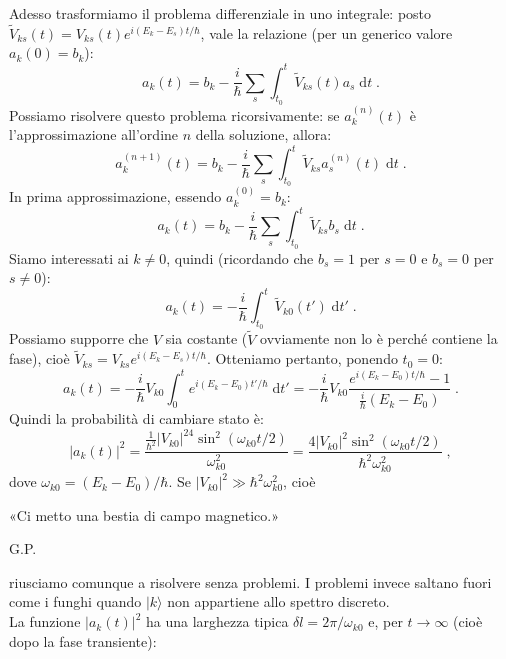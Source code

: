 \documentclass[10pt,a4paper]{report}
\theoremstyle{definition}
\numberwithin{equation}{section}
\newcommand{\diff}[1][]{\mathrm{d}#1}
\newcommand{\ket}{\rangle}
\begin{document}
Adesso trasformiamo il problema differenziale in uno integrale: posto $\tilde{V}_{ks}(t)=V_{ks}(t)e^{i(E_k-E_s)t/\hbar}$, vale la relazione (per un generico valore $a_k(0)=b_k$):
\begin{equation}
a_k(t)=b_k-\frac{i}{\hbar}\sum_s\int_{t_0}^t\tilde{V}_{ks}(t)a_s\;\diff{t}\;.
\end{equation}
Possiamo risolvere questo problema ricorsivamente: se $a_k^{(n)}(t)$ è l'approssimazione all'ordine $n$ della soluzione, allora:
\begin{equation}
a_k^{(n+1)}(t)=b_k-\frac{i}{\hbar}\sum_s\int_{t_0}^t\tilde{V}_{ks}a_s^{(n)}(t)\;\diff{t}\;.
\end{equation}
In prima approssimazione, essendo $a_k^{(0)}=b_k$:
\begin{equation}
a_k(t)=b_k-\frac{i}{\hbar}\sum_s\int_{t_0}^t \tilde{V}_{ks}b_s\;\diff{t}\;.
\end{equation}
Siamo interessati ai $k\ne 0$, quindi (ricordando che $b_s=1$ per $s=0$ e $b_s=0$ per $s\ne 0$):
\begin{equation}
a_k(t)=-\frac{i}{\hbar}\int_{t_0}^t \tilde{V}_{k0}(t')\;\diff{t'}\;.
\end{equation}
Possiamo supporre che $V$ sia costante ($\tilde{V}$ ovviamente non lo è perché contiene la fase), cioè $\tilde{V}_{ks}=V_{ks}e^{i(E_k-E_s)t/\hbar}$. Otteniamo pertanto, ponendo $t_0=0$:
\begin{equation}
a_k(t)=-\frac{i}{\hbar}V_{k0}\int_0^t e^{i(E_k-E_0)t'/\hbar}\;\diff{t'}=-\frac{i}{\hbar}V_{k0}\frac{e^{i(E_k-E_0)t/\hbar}-1}{\frac{i}{\hbar}(E_k-E_0)}\;.
\end{equation}
Quindi la probabilità di cambiare stato è:
\begin{equation}
|a_k(t)|^2=\frac{\frac{1}{\hbar^2}|V_{k0}|^24\sin^2(\omega_{k0}t/2)}{\omega_{k0}^2}=\frac{4|V_{k0}|^2\sin^2(\omega_{k0}t/2)}{\hbar^2\omega_{k0}^2}\;,
\end{equation}
dove $\omega_{k0}=(E_k-E_0)/\hbar$.
Se $|V_{k0}|^2\gg \hbar^2\omega_{k0}^2$, cioè
\begin{quoting}
«Ci metto una bestia di campo magnetico.»
\begin{flushright}
G.P.
\end{flushright}
\end{quoting}
riusciamo comunque a risolvere senza problemi. I problemi invece saltano fuori come i funghi quando $|k\ket$ non appartiene allo spettro discreto. \\
La funzione $|a_k(t)|^2$ ha una larghezza tipica $\delta l=2\pi/\omega_{k0}$ e, per $t\to\infty$ (cioè dopo la fase transiente):
\end{document}
